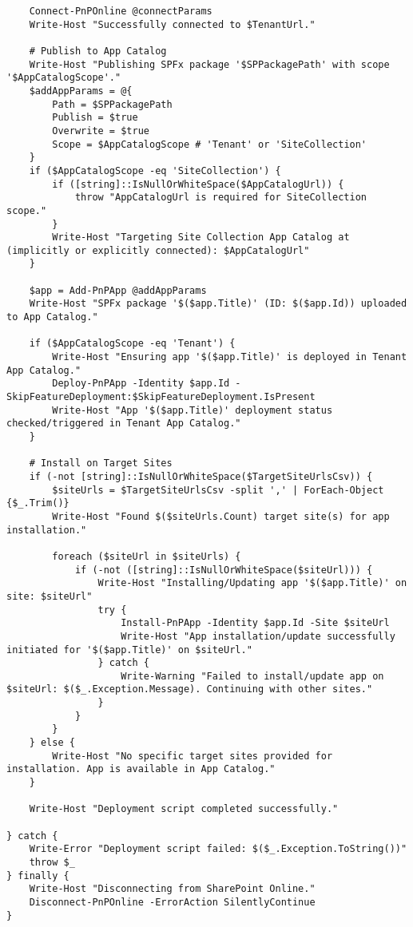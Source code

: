 {\begin{verbatim}
    Connect-PnPOnline @connectParams
    Write-Host "Successfully connected to $TenantUrl."

    # Publish to App Catalog
    Write-Host "Publishing SPFx package '$SPPackagePath' with scope '$AppCatalogScope'."
    $addAppParams = @{
        Path = $SPPackagePath
        Publish = $true
        Overwrite = $true
        Scope = $AppCatalogScope # 'Tenant' or 'SiteCollection'
    }
    if ($AppCatalogScope -eq 'SiteCollection') {
        if ([string]::IsNullOrWhiteSpace($AppCatalogUrl)) {
            throw "AppCatalogUrl is required for SiteCollection scope."
        }
        Write-Host "Targeting Site Collection App Catalog at (implicitly or explicitly connected): $AppCatalogUrl"
    }

    $app = Add-PnPApp @addAppParams
    Write-Host "SPFx package '$($app.Title)' (ID: $($app.Id)) uploaded to App Catalog."

    if ($AppCatalogScope -eq 'Tenant') {
        Write-Host "Ensuring app '$($app.Title)' is deployed in Tenant App Catalog."
        Deploy-PnPApp -Identity $app.Id -SkipFeatureDeployment:$SkipFeatureDeployment.IsPresent
        Write-Host "App '$($app.Title)' deployment status checked/triggered in Tenant App Catalog."
    }

    # Install on Target Sites
    if (-not [string]::IsNullOrWhiteSpace($TargetSiteUrlsCsv)) {
        $siteUrls = $TargetSiteUrlsCsv -split ',' | ForEach-Object {$_.Trim()}
        Write-Host "Found $($siteUrls.Count) target site(s) for app installation."

        foreach ($siteUrl in $siteUrls) {
            if (-not ([string]::IsNullOrWhiteSpace($siteUrl))) {
                Write-Host "Installing/Updating app '$($app.Title)' on site: $siteUrl"
                try {
                    Install-PnPApp -Identity $app.Id -Site $siteUrl
                    Write-Host "App installation/update successfully initiated for '$($app.Title)' on $siteUrl."
                } catch {
                    Write-Warning "Failed to install/update app on $siteUrl: $($_.Exception.Message). Continuing with other sites."
                }
            }
        }
    } else {
        Write-Host "No specific target sites provided for installation. App is available in App Catalog."
    }

    Write-Host "Deployment script completed successfully."

} catch {
    Write-Error "Deployment script failed: $($_.Exception.ToString())"
    throw $_ 
} finally {
    Write-Host "Disconnecting from SharePoint Online."
    Disconnect-PnPOnline -ErrorAction SilentlyContinue
}
\end{verbatim}
}
